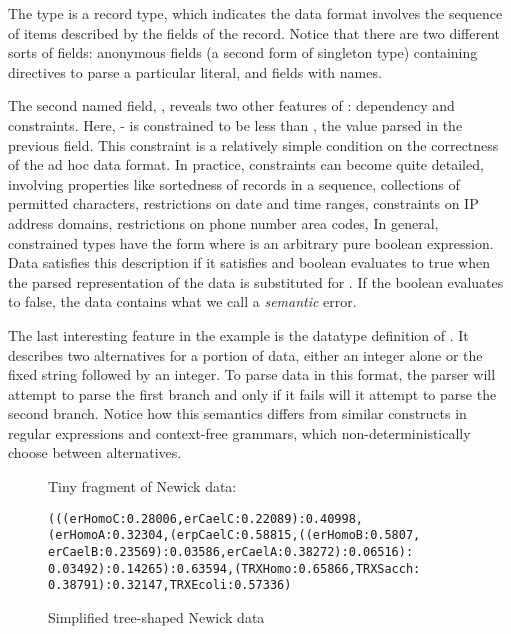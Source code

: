 The type  is a record type, which indicates the data
format involves the sequence of items described by the fields of the
record.  Notice that there are two different sorts of fields:
anonymous fields (a second form of singleton type) containing
directives to parse a particular literal, and fields with names.

The second named field, , reveals two other
features of \padsml: dependency and constraints.  Here,
- is constrained to be less than ,
the value parsed in the previous field.  This constraint is a relatively simple
condition on the correctness of the ad hoc data format.  In practice,
constraints can become quite detailed, involving properties like
sortedness of records in a sequence, collections of permitted characters,
restrictions on date and time ranges, constraints on IP address
domains, restrictions on phone number area codes, \etc{}
In general, constrained
types have the form \cd{[x:T | e]} where  is an arbitrary pure
boolean expression.  Data satisfies this description if it
satisfies  and boolean  evaluates to true when the parsed
representation of the data is substituted for .  If the boolean
evaluates to false, the data contains what we call a \textit{semantic}
error.

The last interesting feature in the \dibbler{} example is the datatype
definition of .  It describes two alternatives for a
portion of data, either an integer alone or the fixed string
 followed by an integer.  To parse data in this format,
the parser will attempt to parse the first branch and only if it fails
will it attempt to parse the second branch.  Notice how this semantics
differs from similar constructs in regular expressions and
context-free grammars, which non-deterministically choose between
alternatives.  
\begin{figure}

Tiny fragment of Newick data:

{\scriptsize
\begin{verbatim}
(((erHomoC:0.28006,erCaelC:0.22089):0.40998,
(erHomoA:0.32304,(erpCaelC:0.58815,((erHomoB:0.5807,
erCaelB:0.23569):0.03586,erCaelA:0.38272):0.06516):
0.03492):0.14265):0.63594,(TRXHomo:0.65866,TRXSacch:
0.38791):0.32147,TRXEcoli:0.57336)
\end{verbatim}
}
  \caption{Simplified tree-shaped Newick data}
  \label{fig:newick}
\end{figure}

